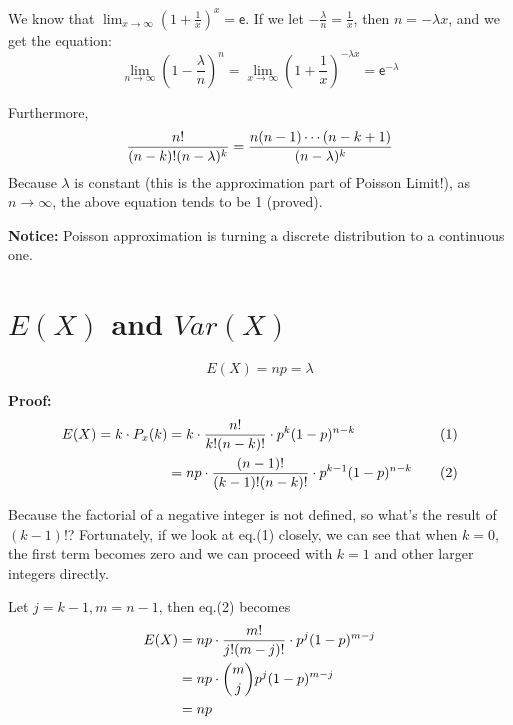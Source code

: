 \documentclass[12pt]{article}
\begin{document}
We know that $\displaystyle \lim_{x \to \infty} \left(1+ \frac{1}{x} \right) ^x = \mathsf{e}$.  If we let $ \displaystyle - \frac{\lambda}{n} = \frac{1}{x}$,  then $ n = -\lambda x$,  and we get the equation:
$$
\lim_{n \to \infty} \left( 1-\frac{\lambda}{n} \right) ^n = \lim_{x \to \infty} \left( 1+ \frac{1}{x} \right) ^{-\lambda x} = \mathsf{e}^{-\lambda}
$$

Furthermore,
$$
\begin{aligned}[t]
 \frac{n!}{(n-k)!(n- \lambda)^k} 
	&= \frac{n(n-1) \cdots  (n-k+1)} {(n- \lambda)^k}   \\
     \end{aligned}\\
$$
Because $\lambda$ is constant (this is the approximation part of Poisson Limit!),  as $n \to \infty$,  the above equation tends to be 1 (proved).  

\textbf{Notice:} Poisson approximation is turning a discrete distribution to a continuous one. 


\section{\large $E(X)$ and $Var(X)$}

 
\begin{tcolorbox} [colback=blue!5!white,  colframe=blue!75!black,  title= {\textbf{Lemma 1: E(X) of a binomial distribution} }]

$$ E(X) = np = \lambda $$

\end{tcolorbox}

\textbf{Proof: }\\
$$
\begin{aligned}[t]
E(X) = k \cdot P_x (k) 
    &= k \cdot \frac{n!}{k!(n-k)!} \cdot p^k (1-p)^{n-k} &&& (1)\\
    &= np \cdot \frac{(n-1)!}{(k-1)!(n-k)! } \cdot p^{k-1} (1-p)^{n-k} &&& (2)\\
     \end{aligned}\\
$$

Because the factorial of a negative integer is not defined,  so what's the result of $(k-1)!$? Fortunately,  if we look at eq.(1) closely,  we can see that when $k=0$,  the first term becomes zero and we can proceed with $k=1$ and other larger integers directly.  

Let $j=k-1, m=n-1$, then eq.(2) becomes
$$
\begin{aligned}[t]
E(X) 
&= np \cdot \frac{m!}{j!(m-j)! } \cdot p^j (1-p)^{m-j}\\
&= np \cdot \displaystyle\binom {m}{j} p^j (1-p)^{m-j}\\
&= np \\
 \end{aligned}\\     
$$
\end{document}
